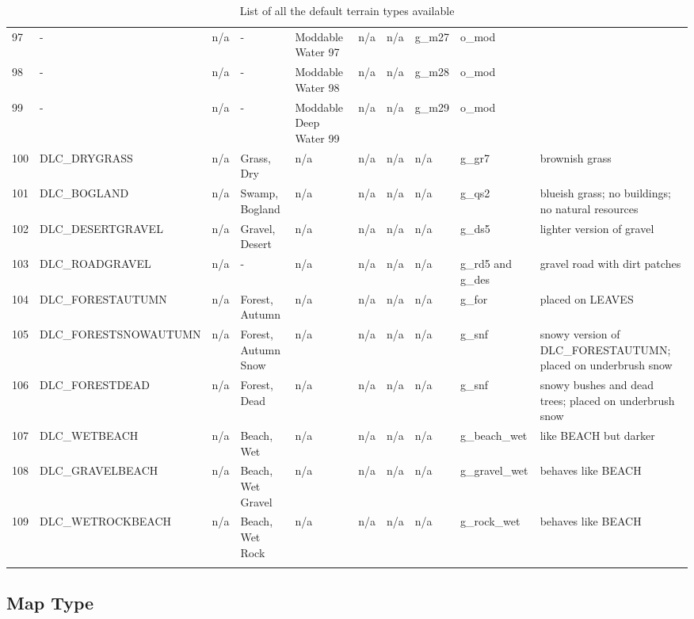 \begin{landscape}
\begin{longtable}{@{}p{5mm}|p{25mm}p{23mm}|p{14mm}p{14mm}p{14mm}p{14mm}|p{10mm}p{15mm}|p{45mm}@{}}
            97	& -	& n/a	& -	& Moddable Water 97	& n/a	& n/a	& g\_m27	& o\_mod		&  \\
            98	& -	& n/a	& -	& Moddable Water 98	& n/a	& n/a	& g\_m28	& o\_mod		&  \\
            99	& -	& n/a	& -	& Moddable Deep Water 99	& n/a	& n/a	& g\_m29	& o\_mod		&  \\
            100	& DLC\_DRYGRASS	& n/a	& Grass, Dry	& n/a	& n/a	& n/a	& n/a	& g\_gr7		& brownish grass \\
            101	& DLC\_BOGLAND	& n/a	& Swamp, Bogland	& n/a	& n/a	& n/a	& n/a	& g\_qs2		& blueish grass; no buildings; no natural resources \\
            102	& DLC\_DESERTGRAVEL	& n/a	& Gravel, Desert	& n/a	& n/a	& n/a	& n/a	& g\_ds5		& lighter version of gravel \\
            103	& DLC\_ROADGRAVEL	& n/a	& -	& n/a	& n/a	& n/a	& n/a	& g\_rd5 and g\_des		& gravel road with dirt patches \\
            104	& DLC\_FORESTAUTUMN	& n/a	& Forest, Autumn	& n/a	& n/a	& n/a	& n/a	& g\_for		& placed on LEAVES \\
            105	& DLC\_FORESTSNOWAUTUMN	& n/a	& Forest, Autumn Snow	& n/a	& n/a	& n/a	& n/a	& g\_snf		& snowy version of DLC\_FORESTAUTUMN; placed on underbrush snow \\
            106	& DLC\_FORESTDEAD	& n/a	& Forest, Dead	& n/a	& n/a	& n/a	& n/a	& g\_snf		& snowy bushes and dead trees; placed on underbrush snow \\
            107	& DLC\_WETBEACH	& n/a	& Beach, Wet	& n/a	& n/a	& n/a	& n/a	& g\_beach\_wet		& like BEACH but darker \\
            108	& DLC\_GRAVELBEACH	& n/a	& Beach, Wet Gravel	& n/a	& n/a	& n/a	& n/a	& g\_gravel\_wet		& behaves like BEACH \\
            109	& DLC\_WETROCKBEACH	& n/a	& Beach, Wet Rock	& n/a	& n/a	& n/a	& n/a	& g\_rock\_wet		& behaves like BEACH \\
            \bottomrule
            \caption{List of all the default terrain types available}
            \label{tbl:terrain}
        \end{longtable}
        
    \end{landscape}

    \subsection{Map Type}
    \label{subsection:maptype}

